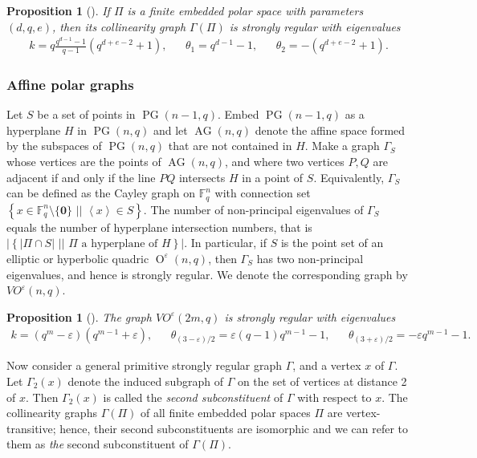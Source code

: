 \documentclass[a4paper]{article}
\newtheorem{prop}[thm]{Proposition}
\theoremstyle{definition}
\newcommand{\eps}{\varepsilon}
\newcommand{\FF}{\mathbb F}
\newcommand{\fq}{\FF_q}
\newcommand{\vspan}[1]{\left\langle #1 \right\rangle}
\newcommand{\sett}[2]{ \left\{ #1 \, \, || \, \, #2 \right \} }
\newcommand{\zero}{\mathbf 0}
\DeclareMathOperator{\PG}{PG}
\newcommand{\pg}{\PG}
\DeclareMathOperator{\AG}{AG}
\newcommand{\ag}{\AG}
\DeclareMathOperator{\OO}{O}
\begin{document}
\begin{prop}[{\cite[Theorem 2.2.12]{Brouwer:VanMaldeghem}}]
 \label{Prop:Eigenvals Coll}
 If $\Pi$ is a finite embedded polar space with parameters $(d,q,e)$, then its collinearity graph $\Gamma(\Pi)$ is strongly regular with eigenvalues
 \begin{align*}
  k = q \frac{q^{d-1}-1}{q-1} (q^{d+e-2}+1), &&
  \theta_1 = q^{d-1} - 1, &&
  \theta_2 = -(q^{d+e-2} +1).
 \end{align*}
\end{prop}

\subsubsection{Affine polar graphs}

Let $S$ be a set of points in $\pg(n-1,q)$.
Embed $\pg(n-1,q)$ as a hyperplane $H$ in $\pg(n,q)$ and let $\ag(n,q)$ denote the affine space formed by the subspaces of $\pg(n,q)$ that are not contained in $H$.
Make a graph $\Gamma_S$ whose vertices are the points of $\ag(n,q)$, and where two vertices $P,Q$ are adjacent if and only if the line $PQ$ intersects $H$ in a point of $S$.
Equivalently, $\Gamma_S$ can be defined as the Cayley graph on $\fq^n$ with connection set $\sett{ x \in \fq^n \setminus \{\zero\}}{ \vspan x \in S }$.
The number of non-principal eigenvalues of $\Gamma_S$ equals the number of hyperplane intersection numbers, that is $|\sett{ | \Pi \cap S | }{\Pi \text{ a hyperplane of } H}|$.
In particular, if $S$ is the point set of an elliptic or hyperbolic quadric $\OO^\eps(n,q)$, then $\Gamma_S$ has two non-principal eigenvalues, and hence is strongly regular.
We denote the corresponding graph by $VO^\eps(n,q)$.

\begin{prop}[{\cite[\S 3.3.1]{Brouwer:VanMaldeghem}}]
 The graph $VO^\eps(2m,q)$ is strongly regular with eigenvalues
 \begin{align*}
  k = (q^m-\eps)(q^{m-1}+\eps), &&
  \theta_{(3-\eps)/2} = \eps(q-1)q^{m-1}-1, &&
  \theta_{(3+\eps)/2} = -\eps q^{m-1} - 1.
 \end{align*}
\end{prop}

Now consider a general primitive strongly regular graph $\Gamma$, and a vertex $x$ of $\Gamma$.
Let $\Gamma_2(x)$ denote the induced subgraph of $\Gamma$ on the set of vertices at distance 2 of $x$.
Then $\Gamma_2(x)$ is called the  \emph{second subconstituent} of $\Gamma$ with respect to $x$.
The collinearity graphs $\Gamma(\Pi)$ of all finite embedded polar spaces $\Pi$ are vertex-transitive; hence, their second subconstituents are isomorphic and we can refer to them as \emph{the} second subconstituent of $\Gamma(\Pi)$.
\end{document}
